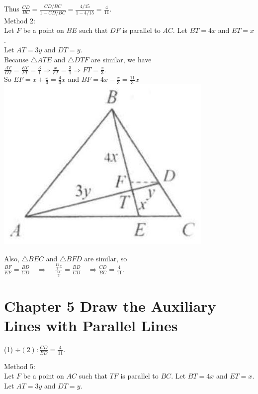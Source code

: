 \documentclass[10pt]{article}
\begin{document}
Thus \(\frac{C D}{B C}=\frac{C D / B C}{1-C D / B C}=\frac{4 / 15}{1-4 / 15}=\frac{4}{11}\).\\
Method 2:\\
Let \(F\) be a point on \(B E\) such that \(D F\) is parallel to \(A C\). Let \(B T=4 x\) and \(E T=x\).\\
Let \(A T=3 y\) and \(D T=y\).\\
Because \(\triangle A T E\) and \(\triangle D T F\) are similar, we have\\
\(\frac{A T}{D T}=\frac{E T}{F T}=\frac{3}{1} \Rightarrow \frac{x}{F T}=\frac{3}{1} \Rightarrow F T=\frac{x}{3}\).\\
So \(E F=x+\frac{x}{3}=\frac{4}{3} x\) and \(B F=4 x-\frac{x}{3}=\frac{11}{3} x\)\\
\includegraphics[max width=\textwidth, center]{2025_04_17_97bc1f7e44d93c271a88g-104(2)}

Also, \(\triangle B E C\) and \(\triangle B F D\) are similar, so\\
\(\frac{B F}{E F}=\frac{B D}{C D} \quad \Rightarrow \quad \frac{\frac{11}{3} x}{\frac{4 x}{3}}=\frac{B D}{C D} \quad \Rightarrow \frac{C D}{B C}=\frac{4}{11}\).

\section*{Chapter 5 Draw the Auxiliary Lines with Parallel Lines}
(1) \(\div(2): \frac{C D}{B D}=\frac{4}{11}\).

Method 5:\\
Let \(F\) be a point on \(A C\) such that \(T F\) is parallel to \(B C\). Let \(B T=4 x\) and \(E T=x\). Let \(A T=3 y\) and \(D T=y\).
\end{document}
